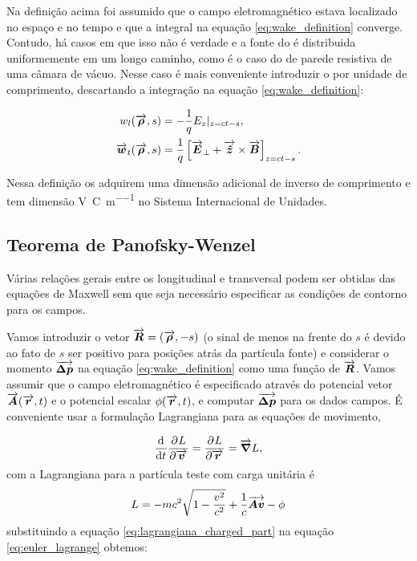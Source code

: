 Na definição acima foi assumido que o campo eletromagnético estava localizado no espaço e no tempo e que a integral na equação \ref{eq:wake_definition} converge. Contudo, há casos em que isso não é verdade e a fonte do  é distribuida uniformemente em um longo caminho, como é o caso do  de parede resistiva de uma câmara de vácuo. Nesse caso é mais conveniente introduzir o  por unidade de comprimento, descartando a integração na equação \ref{eq:wake_definition}:

\begin{equation}\begin{aligned}
    w_l(\overrightarrow{\boldsymbol{\rho}},s) &= -\frac1q E_z|_{z=ct-s}, \\
    \overrightarrow{\boldsymbol{w}}_t(\overrightarrow{\boldsymbol{\rho}},s) &= \frac1q\left[\overrightarrow{\boldsymbol{E}}_\perp + \overrightarrow{\boldsymbol{\hat{z}}}\times \overrightarrow{\boldsymbol{B}}\right]_{z=ct-s}.
\end{aligned}\end{equation}

Nessa definição os  adquirem uma dimensão adicional de inverso de comprimento e tem dimensão \si{\volt\per\coulomb\per\meter} no Sistema Internacional de Unidades.

\subsection{Teorema de Panofsky-Wenzel}

Várias relações gerais entre os  longitudinal e transversal podem ser obtidas das equações de Maxwell sem que seja necessário especificar as condições de contorno para os campos.

Vamos introduzir o vetor $\overrightarrow{\boldsymbol{R}} =(\overrightarrow{\boldsymbol{\rho}},-s)$ (o sinal de menos na frente do $s$ é devido ao fato de $s$ ser positivo para posições atrás da partícula fonte) e considerar o momento $\overrightarrow{\boldsymbol{\Delta p}}$ na equação \ref{eq:wake_definition} como uma função de $\overrightarrow{\boldsymbol{R}}$. Vamos assumir que o campo eletromagnético é especificado através do potencial vetor $\overrightarrow{\boldsymbol{A}}(\overrightarrow{\boldsymbol{r}},t)$ e o potencial escalar $\phi(\overrightarrow{\boldsymbol{r}},t)$, e computar
$\overrightarrow{\boldsymbol{\Delta p}}$ para os dados campos. É conveniente usar a formulação Lagrangiana para as equações de movimento,

\begin{equation}\label{eq:euler_lagrange}
    \frac{\mathrm{d}^{{}}}{\mathrm{d} t^{{}}}\frac{\partial^{{}}L}{\partial \overrightarrow{\boldsymbol{v}}^{{}}} = \frac{\partial^{{}}L}{\partial \overrightarrow{\boldsymbol{r}}^{{}}} = \overrightarrow{\boldsymbol{\nabla}}L,
\end{equation}
com a Lagrangiana para a partícula teste com carga unitária é
\begin{equation}\label{eq:lagrangiana_charged_part}
   L = -mc^2 \sqrt{1 - \frac{v^2}{c^2}} + \frac1c \overrightarrow{\boldsymbol{Av}} - \phi
\end{equation}
substituindo a equação \ref{eq:lagrangiana_charged_part} na equação \ref{eq:euler_lagrange} obtemos:

